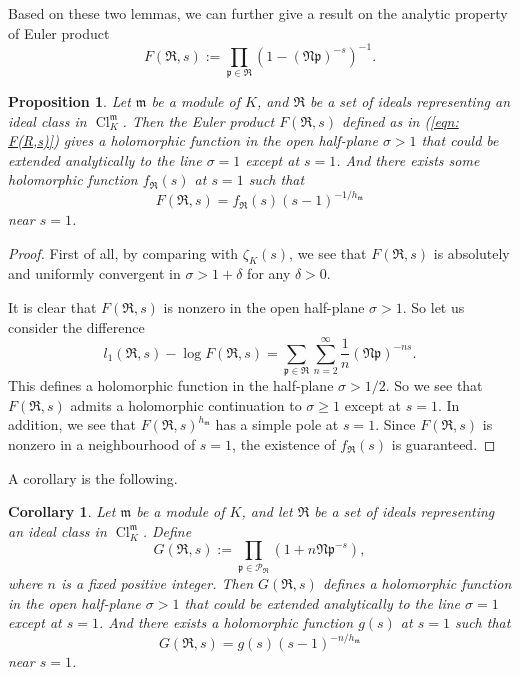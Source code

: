 \documentclass{amsart}
\numberwithin{equation}{section}
\theoremstyle{plain}
\newtheorem{proposition}[theorem]{Proposition}
\newtheorem{corollary}[theorem]{Corollary}
\theoremstyle{definition}
\theoremstyle{remark}
\begin{document}
Based on these two lemmas, we can further give a result on the analytic property of Euler product
\begin{equation}\label{eqn: F(R,s)}
	F(\mathfrak{R},s):=\prod_{\mathfrak{p}\in\mathfrak{R}}(1-(\mathfrak{N}\mathfrak{p})^{-s})^{-1}.
\end{equation}
\begin{proposition}\label{prop: F(R,s)}
	Let $\mathfrak{m}$ be a module of $K$, and $\mathfrak{R}$ be a set of ideals representing an ideal class in $\operatorname{Cl}_K^{\mathfrak{m}}$.
	Then the Euler product $F(\mathfrak{R},s)$ defined as in (\ref{eqn: F(R,s)}) gives a holomorphic function in the open half-plane $\sigma>1$ that could be extended analytically to the line $\sigma=1$ except at $s=1$.
	And there exists some holomorphic function $f_{\mathfrak{R}}(s)$ at $s=1$ such that
	\begin{equation*}
		F(\mathfrak{R},s)=f_{\mathfrak{R}}(s)(s-1)^{-1/h_{\mathfrak{m}}}
	\end{equation*}
	near $s=1$.
\end{proposition}
\begin{proof}
	First of all, by comparing with $\zeta_K(s)$, we see that $F(\mathfrak{R},s)$ is absolutely and uniformly convergent in $\sigma>1+\delta$ for any $\delta>0$.
	
	It is clear that $F(\mathfrak{R},s)$ is nonzero in the open half-plane $\sigma>1$.
	So let us consider the difference
	\begin{equation*}
		l_1(\mathfrak{R},s)-\log F(\mathfrak{R},s)=\sum_{\mathfrak{p}\in\mathfrak{R}}\sum_{n=2}^\infty\frac{1}{n}(\mathfrak{N}\mathfrak{p})^{-ns}.
	\end{equation*}
	This defines a holomorphic function in the half-plane $\sigma>1/2$.
	So we see that $F(\mathfrak{R},s)$ admits a holomorphic continuation to $\sigma\geq1$ except at $s=1$.
	In addition, we see that $F(\mathfrak{R},s)^{h_{\mathfrak{m}}}$ has a simple pole at $s=1$.
	Since $F(\mathfrak{R},s)$ is nonzero in a neighbourhood of $s=1$, the existence of $f_{\mathfrak{R}}(s)$ is guaranteed.
\end{proof}
A corollary is the following.
\begin{corollary}\label{cor: F(R,s)}
	Let $\mathfrak{m}$ be a module of $K$, and let $\mathfrak{R}$ be a set of ideals representing an ideal class in $\operatorname{Cl}_K^{\mathfrak{m}}$.
	Define
	\begin{equation*}
		G(\mathfrak{R},s):=\prod_{\mathfrak{p}\in\mathcal{P}_{\mathfrak{R}}}(1+n\mathfrak{Np}^{-s}),
	\end{equation*}
	where $n$ is a fixed positive integer.
	Then $G(\mathfrak{R},s)$ defines a holomorphic function in the open half-plane $\sigma>1$ that could be extended analytically to the line $\sigma=1$ except at $s=1$.
	And there exists a holomorphic function $g(s)$ at $s=1$ such that
	\begin{equation*}
		G(\mathfrak{R},s)=g(s)(s-1)^{-n/h_{\mathfrak{m}}}
	\end{equation*}
	near $s=1$.
\end{corollary}
\end{document}
